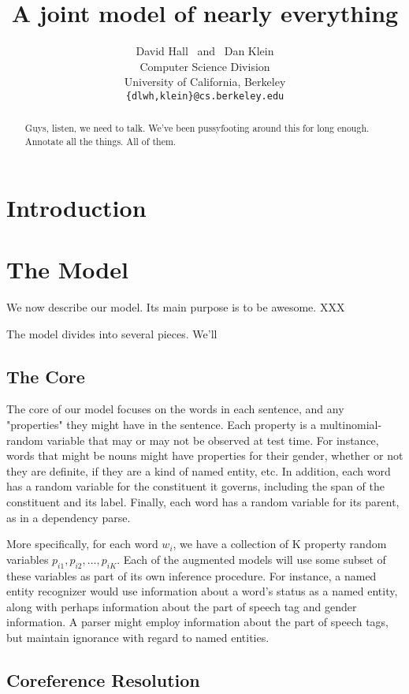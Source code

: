 \documentclass[11pt,letter]{article}
\title{A joint model of nearly everything}
\author{David Hall  ~{\rm {and}} ~Dan Klein \\ Computer Science Division \\
University of California, Berkeley\\
\texttt{\{dlwh,klein\}@cs.berkeley.edu}}
\date{}
\begin{document}
\maketitle
\begin{abstract}

Guys, listen, we need to talk. We've been pussyfooting around this for long
enough. Annotate all the things. All of them.

\end{abstract}

\section{Introduction}


\section{The Model}

We now describe our model.  Its main purpose is to be awesome. 
XXX

The model divides into several pieces. We'll

\subsection{The Core}

The core of our model focuses on the words in each sentence, and any
"properties" they might have in the sentence. Each property is a
multinomial-random variable that may or may not be observed at test time. For
instance, words that might be nouns might have properties for their gender,
whether or not they are definite, if they are a kind of named entity, etc. In
addition, each word has a random variable for the constituent it governs,
including the span of the constituent and its label. Finally, each word has a
random variable for its parent, as in a dependency parse.

More specifically, for each word $w_{i}$, we have a collection of K property
random variables $p_{i1}, p_{i2}, \ldots, p_{iK}$. Each of the augmented models
will use some subset of these variables as part of its own inference procedure.
For instance, a named entity recognizer would use information about a word's
status as a named entity, along with perhaps information about the part of
speech tag and gender information. A parser might employ information about the
part of speech tags, but maintain ignorance with regard to named entities.


\subsection{Coreference Resolution}
\end{document}
